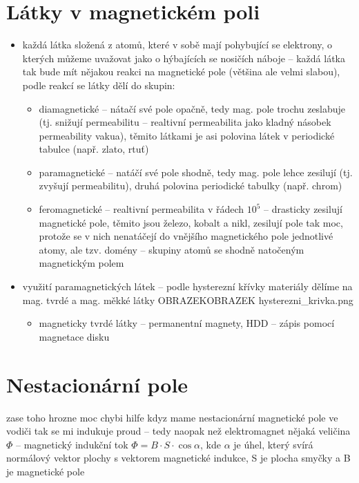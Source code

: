 \documentclass{article}
\begin{document}
\section{Látky v magnetickém poli}
\begin{itemize}
  \item každá látka složená z atomů, které v sobě mají pohybující se elektrony, o kterých můžeme uvažovat jako o hýbajících se nosičích náboje -- každá látka tak bude mít nějakou reakci na magnetické pole (většina ale velmi slabou), podle reakcí se látky dělí do skupin:
  \begin{itemize}
    \item diamagnetické -- nátačí své pole opačně, tedy mag. pole trochu zeslabuje (tj. snižují permeabilitu -- realtivní permeabilita jako kladný násobek permeability vakua), těmito látkami je asi polovina látek v periodické tabulce (např. zlato, rtuť)
    \item paramagnetické -- natáčí své pole shodně, tedy mag. pole lehce zesilují (tj. zvyšují permeabilitu), druhá polovina periodické tabulky (např. chrom)
    \item feromagnetické -- realtivní permeabilita v řádech $10^5$ -- drasticky zesilují magnetické pole, těmito jsou železo, kobalt a nikl, zesilují pole tak moc, protože se v nich nenatáčejí do vnějšího magnetického pole jednotlivé atomy, ale tzv. domény -- skupiny atomů se shodně natočeným magnetickým polem
  \end{itemize}
  \item využití paramagnetických látek -- podle hysterezní křívky materiály dělíme na mag. tvrdé a mag. měkké látky OBRAZEKOBRAZEK hysterezni\_krivka.png
  \begin{itemize}
    \item magneticky tvrdé látky -- permanentní magnety, HDD -- zápis pomocí magnetace disku
  \end{itemize}
\end{itemize}

\section{Nestacionární pole}
zase toho hrozne moc chybi hilfe
kdyz mame nestacionární magnetické pole ve vodiči tak se mi indukuje proud -- tedy naopak než elektromagnet
nějaká veličina $\Phi$ -- magnetický indukční tok $\Phi = B \cdot S \cdot \cos \alpha$,
kde $\alpha$ je úhel, který svírá normálový vektor plochy s vektorem magnetické indukce, S je plocha smyčky a B je magnetické pole
\end{document}
